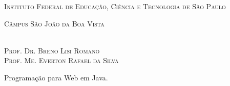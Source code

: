 \begin{titlingpage}
    
    
    \center
    
    \noindent
    \chaptitlefont\large\textsc{Instituto Federal de Educação, Ciência e Tecnologia de São Paulo}
    \vspace{0.5cm}
    
    \noindent    
    \chaptitlefont\large\textsc{Câmpus São João da Boa Vista}
    \vspace{2.5cm}
    
    \noindent
    \chaptitlefont\Large\textsc{\theauthor}
    \vspace{0.5cm}
    \\\chaptitlefont\large\textsc{Prof. Dr. Breno Lisi Romano}
    \\\chaptitlefont\large\textsc{Prof. Me. Everton Rafael da Silva}
    \vspace{2.5cm}
    
    \noindent
    \chaptitlefont\HUGE\textsc{\thetitle}
    \vspace{1.5cm}
    
    \hspace{.4\textwidth}
        \begin{flushright}
            \begin{minipage}{.5\textwidth}
                \SingleSpacing
                \large Programação para Web em Java.
            \end{minipage}%
        \end{flushright}
    
    \vspace*{\fill}
        
    \noindent
    \large\textsc{\thedate}
    
    \restoregeometry
    
\end{titlingpage}